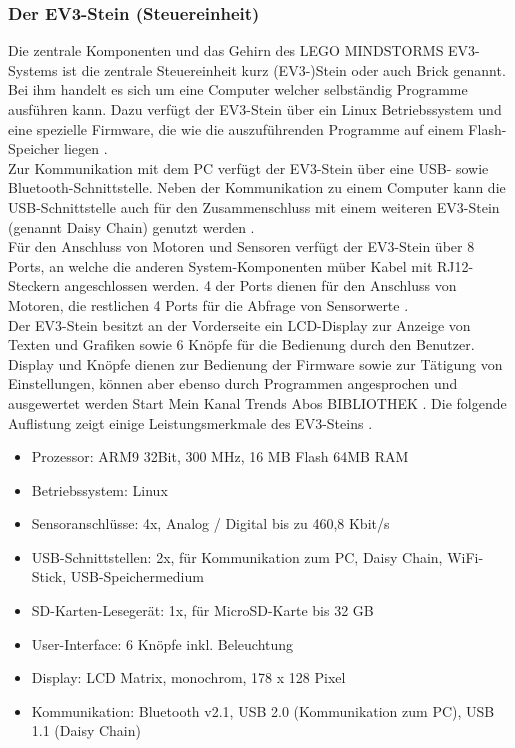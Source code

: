 \subsubsection{Der EV3-Stein (Steuereinheit)}
\color{finishing}
Die zentrale Komponenten und das Gehirn des LEGO MINDSTORMS EV3-Systems ist die zentrale Steuereinheit kurz (EV3-)Stein oder auch Brick genannt. Bei ihm handelt
es sich um eine Computer welcher selbständig Programme ausführen kann. Dazu verfügt der EV3-Stein über 
ein Linux Betriebssystem und eine spezielle Firmware, die wie die auszuführenden Programme auf einem Flash-Speicher liegen \cite[vgl.][21]{Scholz.DasEV3}. \\
Zur Kommunikation mit dem PC verfügt der EV3-Stein über eine USB- sowie Bluetooth-Schnittstelle. Neben der 
Kommunikation zu einem Computer kann die USB-Schnittstelle auch für den Zusammenschluss mit einem weiteren EV3-Stein (genannt Daisy Chain) 
genutzt werden \cite[vgl.][Seite 21]{Scholz.DasEV3}.  \\
Für den Anschluss von Motoren und Sensoren verfügt der EV3-Stein über 8 Ports, an welche die anderen System-Komponenten müber Kabel mit RJ12-Steckern angeschlossen werden. 4 der Ports dienen für den Anschluss von
Motoren, die restlichen 4 Ports für die Abfrage von Sensorwerte \cite[vgl.][21]{Scholz.DasEV3}.  \\
Der EV3-Stein besitzt an der Vorderseite ein LCD-Display zur Anzeige von Texten und Grafiken sowie  
6 Knöpfe für die Bedienung durch den Benutzer. Display und Knöpfe dienen zur Bedienung der Firmware sowie zur Tätigung von Einstellungen, können aber ebenso durch Programmen angesprochen und ausgewertet werden
Start
Mein Kanal
Trends
Abos
BIBLIOTHEK
\cite[vgl.][21]{Scholz.DasEV3}. 
\smallskip
\newline
Die folgende Auflistung zeigt einige Leistungsmerkmale des EV3-Steins \citep[vgl.][Seite 23 f., Seite 32]{Scholz.DasEV3, Schobel.RobertaEV3Programmieren}.
\begin{itemize}
	\item{Prozessor:} ARM9 32Bit, 300 MHz, 16 MB Flash 64MB RAM
	\item{Betriebssystem:} Linux
	\item{Sensoranschlüsse:} 4x, Analog / Digital bis zu 460,8 Kbit/s
	\item{USB-Schnittstellen:} 2x, für Kommunikation zum PC, Daisy Chain, WiFi-Stick, USB-Speichermedium
	\item{SD-Karten-Lesegerät:} 1x, für MicroSD-Karte bis 32 GB
	\item{User-Interface:} 6 Knöpfe inkl. Beleuchtung
	\item{Display:} LCD Matrix, monochrom, 178 x 128 Pixel
	\item{Kommunikation:} Bluetooth v2.1, USB 2.0 (Kommunikation zum PC), USB 1.1 (Daisy Chain)
\end{itemize}
